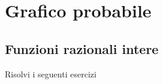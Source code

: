 \chapter{Grafico probabile}
\section{Funzioni razionali intere}
Risolvi i seguenti esercizi
\tcbstartrecording
%
%	
%	
%	
%		
%		
%		
%		
%		
%		
